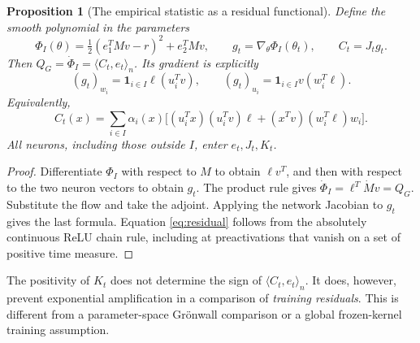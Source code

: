 \documentclass[10pt]{article}
\newtheorem{proposition}[theorem]{Proposition}
\newcommand{\ip}[2]{\langle #1,#2\rangle_n}
\begin{document}
\begin{proposition}[The empirical statistic as a residual functional]\label{prop:potential}
Define the smooth polynomial in the parameters
\[
 \Phi_I(\theta)=\tfrac12(e_1^TMv-r)^2+e_2^TMv,\qquad
 g_t=\nabla_\theta\Phi_I(\theta_t),\qquad C_t=J_tg_t.
\]
Then $Q_G=\dot\Phi_I=\ip{C_t}{e_t}$. Its gradient is explicitly
\[
 (g_t)_{w_i}=\mathbf1_{i\in I}\ell(u_i^Tv),\qquad
 (g_t)_{u_i}=\mathbf1_{i\in I}v(w_i^T\ell).
\]
Equivalently,
\[
 C_t(x)=\sum_{i\in I}\alpha_i(x)
 \big[(u_i^Tx)(u_i^Tv)\ell+(x^Tv)(w_i^T\ell)w_i\big].
\]
All neurons, including those outside $I$, enter $e_t,J_t,K_t$.
\end{proposition}
\begin{proof}
Differentiate $\Phi_I$ with respect to $M$ to obtain $\ell v^T$, and then
with respect to the two neuron vectors to obtain $g_t$. The product rule gives
$\dot\Phi_I=\ell^T\dot Mv=Q_G$. Substitute the flow and take the adjoint.
Applying the network Jacobian to $g_t$ gives the last formula. Equation
\eqref{eq:residual} follows from the absolutely continuous ReLU chain rule,
including at preactivations that vanish on a set of positive time measure.
\end{proof}
The positivity of $K_t$ does not determine the sign of $\ip{C_t}{e_t}$.
It does, however, prevent exponential amplification in a comparison of
\emph{training residuals}. This is different from a parameter-space
Gr\"onwall comparison or a global frozen-kernel training assumption.
\end{document}
